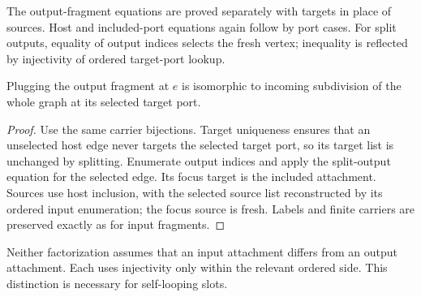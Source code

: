 The output-fragment equations are proved separately with targets in place of
sources. Host and included-port equations again follow by port cases. For
split outputs, equality of output indices selects the fresh vertex; inequality
is reflected by injectivity of ordered target-port lookup.
\begin{theorem}
Plugging the output fragment at $e$ is isomorphic to incoming subdivision of
the whole graph at its selected target port.
\end{theorem}
\begin{proof}
Use the same carrier bijections. Target uniqueness ensures that an unselected
host edge never targets the selected target port, so its target list is
unchanged by splitting. Enumerate output indices and apply the split-output
equation for the selected edge. Its focus target is the included attachment.
Sources use host inclusion, with the selected source list reconstructed by
its ordered input enumeration; the focus source is fresh. Labels and finite
carriers are preserved exactly as for input fragments.
\end{proof}
Neither factorization assumes that an input attachment differs from an output
attachment. Each uses injectivity only within the relevant ordered side.
This distinction is necessary for self-looping slots.

